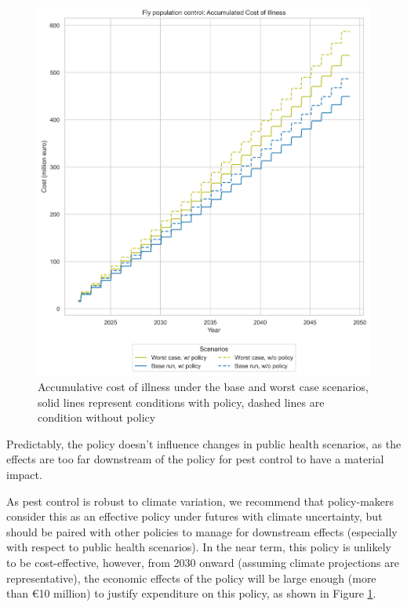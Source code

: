 \begin{figure}[h!]
\begin{minipage}{0.45\textwidth}
    \end{minipage}\hfill
    \begin{minipage}{0.45\textwidth}
        \centering
        \includegraphics[width=1\textwidth]{images/pc_Base and Worst Case_acoi.png} 
        \caption{Accumulative cost of illness under the base and worst case scenarios, solid lines represent conditions with policy, dashed lines are condition without policy}
        \label{fig:pc_bwc_acoi}
    \end{minipage}
\end{figure}

Predictably, the policy doesn't influence changes in public health scenarios, as the effects are too far downstream of the policy for pest control to have a material impact. 

As pest control is robust to climate variation, we recommend that policy-makers consider this as an effective policy under futures with climate uncertainty, but should be paired with other policies to manage for downstream effects (especially with respect to public health scenarios). In the near term, this policy is unlikely to be cost-effective, however, from 2030 onward (assuming climate projections are representative), the economic effects of the policy will be large enough (more than €10 million) to justify expenditure on this policy, as shown in Figure \ref{fig:pc_bwc_acoi}. 

